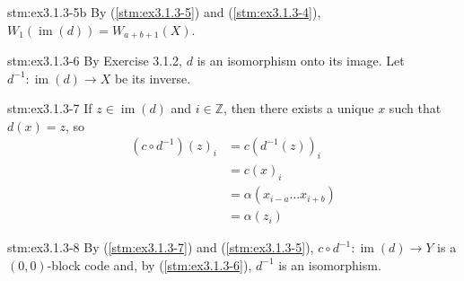 \begin{statement}{stm:ex3.1.3-5b}
By (\ref{stm:ex3.1.3-5}) and (\ref{stm:ex3.1.3-4}), $W_1(\operatorname{im}(d)) = W_{a+b+1}(X)$.
\end{statement}

\begin{statement}{stm:ex3.1.3-6}
By Exercise 3.1.2, $d$ is an isomorphism onto its image. Let $d^{-1}: \operatorname{im}(d) \to X$ be its inverse.
\end{statement}

\begin{statement}{stm:ex3.1.3-7}
If $z \in \operatorname{im}(d)$ and $i \in \mathbb{Z}$, then there exists a unique $x$ such that $d(x) = z$, so
\begin{align*}
(c \circ d^{-1})(z)_i &= c(d^{-1}(z))_i \\
&= c(x)_i \\
&= \alpha(x_{i-a} \ldots x_{i+b}) \\
&= \alpha(z_i)
\end{align*}
\end{statement}

\begin{statement}{stm:ex3.1.3-8}
By (\ref{stm:ex3.1.3-7}) and (\ref{stm:ex3.1.3-5}), $c \circ d^{-1}: \operatorname{im}(d) \to Y$ is a $(0,0)$-block code and, by (\ref{stm:ex3.1.3-6}), $d^{-1}$ is an isomorphism.
\end{statement}
